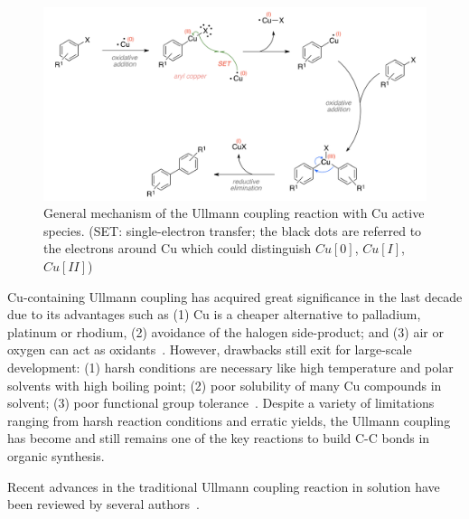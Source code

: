 \documentclass[%
 reprint,
 amsmath,amssymb,
 aps,
prb,
]{revtex4-1}
\begin{document}
\begin{figure}[htb]
\centering
\includegraphics[width=0.90\columnwidth]{Fig/classical-mechanism.png}
\caption{General mechanism of the Ullmann coupling reaction with Cu active species. (SET: single-electron transfer; the black dots are referred to the electrons around Cu which could distinguish $Cu[0]$, $Cu[I]$, $Cu[II]$)}
\label{fig:classical}
\end{figure}
Cu-containing Ullmann coupling has acquired great significance in the last decade due to its advantages such as (1) Cu is a cheaper alternative to palladium, platinum or rhodium,  (2) avoidance of the halogen side-product; and (3) air or oxygen can act as oxidants~\cite{ullmann_38,ullmann_39,ullmann_40,ullmann_41}. However, drawbacks still exit for large-scale development: (1) harsh conditions are necessary like high temperature and polar solvents with high boiling point; (2) poor solubility of many Cu compounds in solvent; (3) poor functional group tolerance~\cite{ullmann_31}. Despite a variety of limitations ranging from harsh reaction conditions and erratic yields, the Ullmann coupling has become and still remains one of the key reactions to build C-C bonds in organic synthesis. 

Recent advances in the traditional Ullmann coupling reaction in solution have been reviewed by several authors~\cite{ullmann_29,ullmann_30,ullmann_31,ullmann_32}.
\end{document}
